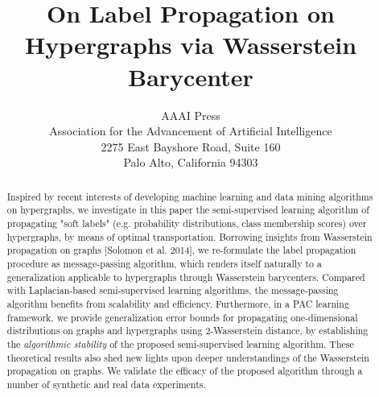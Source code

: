 \documentclass[letterpaper]{article} %
\begin{document}
\title{On Label Propagation on Hypergraphs via Wasserstein Barycenter}
\author{AAAI Press\\
Association for the Advancement of Artificial Intelligence\\
2275 East Bayshore Road, Suite 160\\
Palo Alto, California 94303\\
}
\maketitle

\begin{abstract}
Inspired by recent interests of developing machine learning and data mining algorithms on hypergraphs, we investigate in this paper the semi-supervised learning algorithm of propagating "soft labels" (e.g. probability distributions, class membership scores) over hypergraphs, by means of optimal transportation. Borrowing insights from Wasserstein propagation on graphs [Solomon et al. 2014], we re-formulate the label propagation procedure as message-passing algorithm, which renders itself naturally to a generalization applicable to hypergraphs through Wasserstein barycenters. Compared with Laplacian-based semi-supervised learning algorithms, the message-passing algorithm benefits from scalability and efficiency. Furthermore, in a PAC learning framework, we provide generalization error bounds for propagating one-dimensional distributions on graphs and hypergraphs using 2-Wasserstein distance, by establishing the \textit{algorithmic stability} of the proposed semi-supervised learning algorithm. These theoretical results also shed new lights upon deeper understandings of the Wasserstein propagation on graphs. We validate the efficacy of the proposed algorithm through a number of synthetic and real data experiments.
\end{abstract}
	
\end{document}
